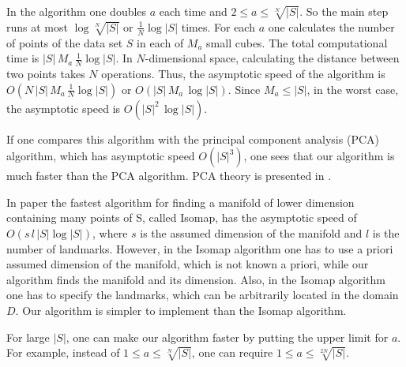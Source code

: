 \documentclass[12pt]{article}
\theoremstyle{plain}
\begin{document}
\noindent In the algorithm one doubles $a$ each time and $2 \leq a \leq \sqrt[N]{|S|}$. So the main step runs at most
$\log \sqrt[N]{|S|}$ or $\frac{1}{N}\log |S|$ times. For each $a$ one calculates the number of points of the data set $S$ in each of $M_a$ small cubes.
 The total computational time is $|S| \, M_a \, \frac{1}{N}\log |S|$. In $N$-dimensional space, calculating the distance between two points takes $N$
 operations. Thus, the asymptotic speed of the algorithm is $O\left( N \, |S| \, M_a \, \frac{1}{N}\log |S| \right)$ or
  $O\left( |S| \, M_a \,\log |S| \right)$. Since $M_a \leq |S|$, in the worst case, the asymptotic speed is $O(|S|^2 \, \log |S|)$.

\noindent If one compares this algorithm with the principal component analysis (PCA) algorithm, which has asymptotic speed $O(|S|^3)$, one
sees that our algorithm is much faster than the PCA algorithm. PCA theory is presented in \cite{J}.

\noindent In paper \cite{Cayton} the fastest algorithm for finding a manifold of lower dimension containing many points of S, called Isomap,
 has the asymptotic speed of $O(s \, l \, |S| \log |S|)$, where $s$ is the assumed dimension of the manifold and $l$ is the number of landmarks.
  However, in the Isomap algorithm one has to use a priori assumed dimension of the manifold, which is not known a priori, while our algorithm finds
   the manifold and its dimension. Also, in the Isomap algorithm one has to specify the landmarks, which can be arbitrarily located in the domain $D$.
    Our algorithm is simpler to implement than the Isomap algorithm.

\noindent For large $|S|$, one can make our algorithm faster by putting the upper limit for $a$. For example, instead of 
$1 \leq a \leq \sqrt[N]{|S|}$, one can require $1 \leq a \leq \sqrt[2N]{|S|}$.
\end{document}
